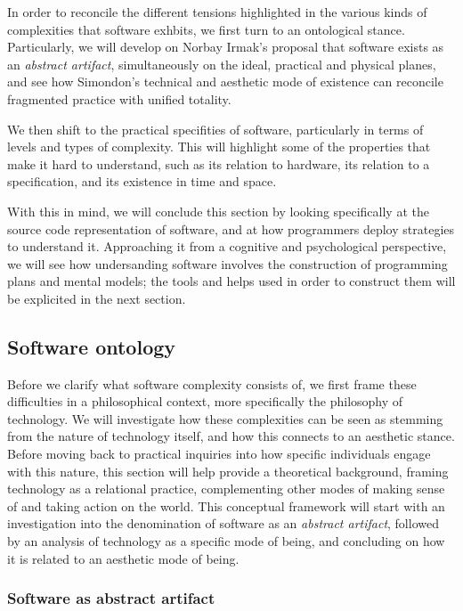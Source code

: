 In order to reconcile the different tensions highlighted in the various kinds of complexities that software exhbits, we first turn to an ontological stance. Particularly, we will develop on Norbay Irmak's proposal that software exists as an \emph{abstract artifact}, simultaneously on the ideal, practical and physical planes, and see how Simondon's technical and aesthetic mode of existence can reconcile fragmented practice with unified totality.

We then shift to the practical specifities of software, particularly in terms of levels and types of complexity. This will highlight some of the properties that make it hard to understand, such as its relation to hardware, its relation to a specification, and its existence in time and space.

With this in mind, we will conclude this section by looking specifically at the source code representation of software, and at how programmers deploy strategies to understand it. Approaching it from a cognitive and psychological perspective, we will see how undersanding software involves the construction of programming plans and mental models; the tools and helps used in order to construct them will be explicited in the next section.

\subsection{Software ontology}
\label{subsec:software-ontology}

Before we clarify what software complexity consists of, we first frame these difficulties in a philosophical context, more specifically the philosophy of technology. We will investigate how these complexities can be seen as stemming from the nature of technology itself, and how this connects to an aesthetic stance. Before moving back to practical inquiries into how specific individuals engage with this nature, this section will help provide a theoretical background, framing technology as a relational practice, complementing other modes of making sense of and taking action on the world. This conceptual framework will start with an investigation into the denomination of software as an \emph{abstract artifact}, followed by an analysis of technology as a specific mode of being, and concluding on how it is related to an aesthetic mode of being.

\subsubsection{Software as abstract artifact}
\label{subsubsec:abstract-artifact}

